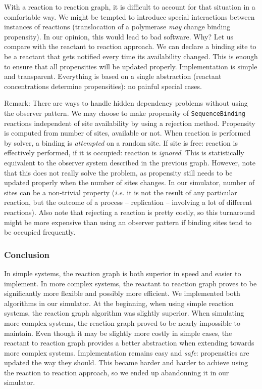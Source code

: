 With a reaction to reaction graph, it is difficult to account for that situation in a comfortable way. We might be tempted to introduce special interactions between instances of reactions (translocation of a polymerase \emph{may} change binding propensity). In our opinion, this would lead to bad software. Why? Let us compare with the reactant to reaction approach. We can declare a binding site to be a reactant that gets notified every time its availability changed. This is enough to ensure that all propensities will be updated properly. Implementation is simple and transparent. Everything is based on a single abstraction (reactant concentrations determine propensities): no painful special cases.

\begin{footnotesize}
  Remark: There are ways to handle hidden dependency problems without using the observer pattern. We may choose to make propensity of \texttt{SequenceBinding} reactions independent of site availability by using a rejection method. Propensity is computed from number of sites, available or not. When reaction is performed by solver, a binding is \emph{attempted} on a random site. If site is free: reaction is effectively performed, if it is occupied: reaction is \emph{ignored}. This is statistically equivalent to the observer system described in the previous graph. However, note that this does not really solve the problem, as propensity still needs to be updated properly when the number of sites changes. In our simulator, number of sites can be a non-trivial property (\textit{i.e.} it is not the result of any particular reaction, but the outcome of a process -- replication -- involving a lot of different reactions). Also note that rejecting a reaction is pretty costly, so this turnaround might be more expensive than using an observer pattern if binding sites tend to be occupied frequently.
\end{footnotesize}

\subsubsection{Conclusion}

In simple systems, the reaction graph is both superior in speed and easier to implement. In more complex systems, the reactant to reaction graph proves to be significantly more flexible and possibly more efficient. We implemented both algorithms in our simulator. At the beginning, when using simple reaction systems, the reaction graph algorithm was slightly superior. When simulating more complex systems, the reaction graph proved to be nearly impossible to maintain. Even though it may be slightly more costly in simple cases, the reactant to reaction graph provides a better abstraction when extending towards more complex systems. Implementation remains easy and \emph{safe}: propensities are updated the way they should. This became harder and harder to achieve using the reaction to reaction approach, so we ended up abandonning it in our simulator.
